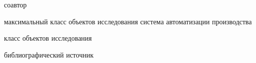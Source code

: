 \begin{SCn}
    \scnsectionheader{\currentname}
    \begin{scnsubstruct}
        \begin{scnrelfromlist}{соавтор}
        \end{scnrelfromlist}

        \begin{scnhaselementrole}{максимальный класс объектов исследования}
            {система автоматизации производства}
        \end{scnhaselementrole}
        \begin{scnhaselementrolelist}{класс объектов исследования}
        \end{scnhaselementrolelist}
        \begin{scnrelfromlist}{библиографический источник}
        \end{scnrelfromlist}
        
        \bigskip


\end{scnsubstruct}
\end{SCn}
